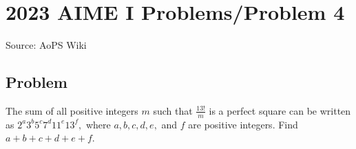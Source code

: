 \documentclass[12pt]{article}
\begin{document}
\section*{{2023 AIME I Problems/Problem 4}}
Source: AoPS Wiki

\subsection*{Problem}
The sum of all positive integers $m$ such that $\frac{13!}{m}$ is a perfect square can be written as $2^a3^b5^c7^d11^e13^f,$ where $a,b,c,d,e,$ and $f$ are positive integers. Find $a+b+c+d+e+f.$
\end{document}
